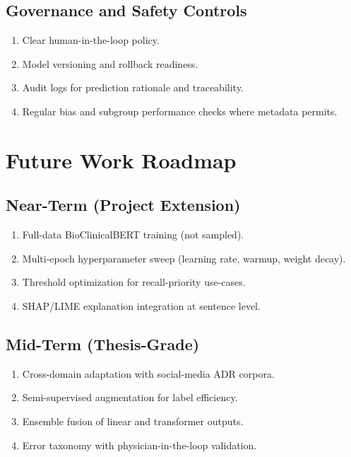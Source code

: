 \documentclass[11pt]{article}
\begin{document}
\subsection{Governance and Safety Controls}

\begin{enumerate}
  \item Clear human-in-the-loop policy.
  \item Model versioning and rollback readiness.
  \item Audit logs for prediction rationale and traceability.
  \item Regular bias and subgroup performance checks where metadata permits.
\end{enumerate}

\section{Future Work Roadmap}

\subsection{Near-Term (Project Extension)}

\begin{enumerate}
  \item Full-data BioClinicalBERT training (not sampled).
  \item Multi-epoch hyperparameter sweep (learning rate, warmup, weight decay).
  \item Threshold optimization for recall-priority use-cases.
  \item SHAP/LIME explanation integration at sentence level.
\end{enumerate}

\subsection{Mid-Term (Thesis-Grade)}

\begin{enumerate}
  \item Cross-domain adaptation with social-media ADR corpora.
  \item Semi-supervised augmentation for label efficiency.
  \item Ensemble fusion of linear and transformer outputs.
  \item Error taxonomy with physician-in-the-loop validation.
\end{enumerate}
\end{document}
